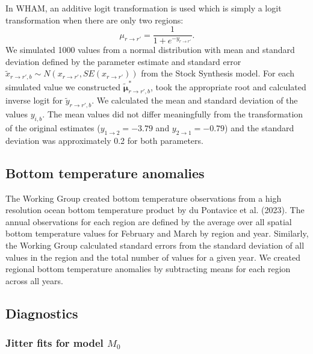 \documentclass[
]{article}
\begin{document}
In WHAM, an additive logit transformation is used which is simply a logit transformation when there are only two regions:
\[
\mu_{r\rightarrow r'} = \frac{1}{1+e^{-y_{r\rightarrow r'}}}.
\]
We simulated 1000 values from a normal distribution with mean and standard deviation defined by the parameter estimate and standard error \(\tilde x_{{r\rightarrow r'},b} \sim N(x_{r\rightarrow r'}, SE(x_{r\rightarrow r'}))\) from the Stock Synthesis model. For each simulated value we constructed \(\tilde {\boldsymbol{\mu}}^*_{{r\rightarrow r'},b}\), took the appropriate root and calculated inverse logit for \(\tilde y_{{r\rightarrow r'},b}\). We calculated the mean and standard deviation of the values \(y_{i,b}\). The mean values did not differ meaningfully from the transformation of the original estimates (\(y_{1\rightarrow 2} = -3.79\) and \(y_{2\rightarrow 1} = -0.79\)) and the standard deviation was approximately 0.2 for both parameters.

\hypertarget{bottom-temperature-anomalies}{%
\subsection*{Bottom temperature anomalies}\label{bottom-temperature-anomalies}}

The Working Group created bottom temperature observations from a high resolution ocean bottom temperature product by du Pontavice et al. (2023). The annual observations for each region are defined by the average over all spatial bottom temperature values for February and March by region and year. Similarly, the Working Group calculated standard errors from the standard deviation of all values in the region and the total number of values for a given year. We created regional bottom temperature anomalies by subtracting means for each region across all years.

\hypertarget{diagnostics}{%
\subsection*{Diagnostics}\label{diagnostics}}

\hypertarget{jitter-fits-for-model-m_0}{%
\subsubsection*{\texorpdfstring{Jitter fits for model \(M_0\)}{Jitter fits for model M\_0}}\label{jitter-fits-for-model-m_0}}
\end{document}
